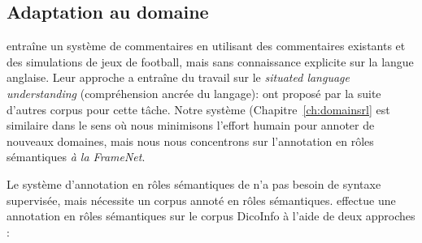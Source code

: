 %


\subsection{Adaptation au domaine}

\cite{chen2008learning} entraîne un système de commentaires en utilisant des
commentaires existants et des simulations de jeux de football, mais sans
connaissance explicite sur la langue anglaise. Leur approche a entraîne du
travail sur le \emph{situated language understanding} (compréhension ancrée du
langage): \cite{bordes2010towards,richardson2012towards} ont proposé par la
suite d'autres corpus pour cette tâche. Notre système
(Chapitre~\ref{ch:domainsrl} est similaire dans le sens où nous minimisons
l'effort humain pour annoter de nouveaux domaines, mais nous nous concentrons
sur l'annotation en rôles sémantiques \emph{à la FrameNet}.

Le système d'annotation en rôles sémantiques de \cite{gormley2014low} n'a pas
besoin de syntaxe supervisée, mais nécessite un corpus annoté en rôles
sémantiques. \cite{hadouche2011annotation} effectue une annotation en rôles
sémantiques sur le corpus DicoInfo \citep{corpusolst} à l'aide de deux
approches :

